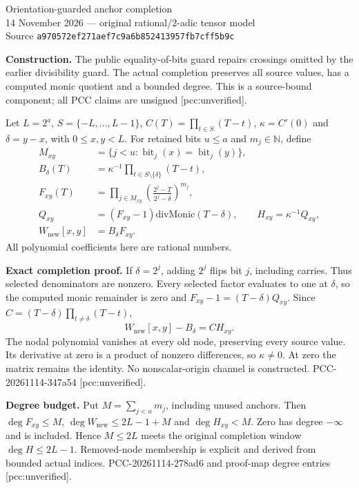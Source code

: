 \documentclass[10pt]{article}
\begin{document}
\begin{center}
{\Large Orientation-guarded anchor completion}\\[4pt]
14 November 2026 --- original rational/2-adic tensor model\\
Source \texttt{a970572ef271aef7c9a6b852413957fb7cff5b9c}
\end{center}

\textbf{Construction.} The public equality-of-bits guard repairs crossings
omitted by the earlier divisibility guard. The actual completion preserves
all source values, has a computed monic quotient and a bounded degree.
This is a source-bound component; all PCC claims are unsigned
[pcc:unverified].

Let $L=2^a$, $S=\{-L,\ldots,L-1\}$,
$C(T)=\prod_{t\in S}(T-t)$, $\kappa=C'(0)$ and $\delta=y-x$, with
$0\le x,y<L$. For retained bits $u\le a$ and $m_j\in\mathbb N$, define
\begin{align*}
 M_{xy}&=\{j<u:\operatorname{bit}_j(x)=\operatorname{bit}_j(y)\},\\
 B_\delta(T)&=\kappa^{-1}\prod_{t\in S\setminus\{\delta\}}(T-t),\\
 F_{xy}(T)&=\prod_{j\in M_{xy}}
 \left(\frac{2^j-T}{2^j-\delta}\right)^{m_j},\\
 Q_{xy}&=(F_{xy}-1)\mathbin{\mathrm{divMonic}}(T-\delta),\qquad
 H_{xy}=\kappa^{-1}Q_{xy},\\
 W_{\mathrm{new}}[x,y]&=B_\delta F_{xy}.
\end{align*}
All polynomial coefficients here are rational numbers.

\textbf{Exact completion proof.} If $\delta=2^j$, adding $2^j$ flips bit
$j$, including carries. Thus selected denominators are nonzero. Every
selected factor evaluates to one at $\delta$, so the computed monic
remainder is zero and $F_{xy}-1=(T-\delta)Q_{xy}$. Since
$C=(T-\delta)\prod_{t\ne\delta}(T-t)$,
\[
 W_{\mathrm{new}}[x,y]-B_\delta=C H_{xy}.
\]
The nodal polynomial vanishes at every old node, preserving every source
value. Its derivative at zero is a product of nonzero differences, so
$\kappa\ne0$. At zero the matrix remains the identity. No nonscalar-origin
channel is constructed. PCC-20261114-347a54 [pcc:unverified].

\textbf{Degree budget.} Put $M=\sum_{j<u}m_j$, including unused anchors.
Then $\deg F_{xy}\le M$, $\deg W_{\mathrm{new}}\le2L-1+M$ and
$\deg H_{xy}<M$. Zero has degree $-\infty$ and is included. Hence
$M\le2L$ meets the original completion window $\deg H\le2L-1$.
Removed-node membership is explicit and derived from bounded actual indices.
PCC-20261114-278ad6 and proof-map degree entries [pcc:unverified].
\end{document}
